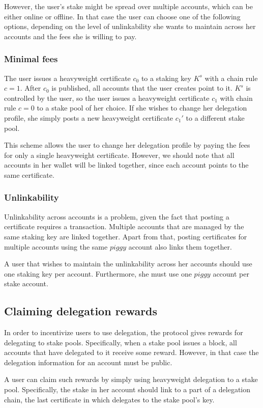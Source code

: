 However, the user's stake might be spread over multiple accounts, which can be either online or offline. In that case the user can choose one of the following options, depending on the level of unlinkability she wants to maintain across her accounts and the fees she is willing to pay.

\subsubsection{Minimal fees}

The user issues a heavyweight certificate $c_0$ to a staking key $K^s$ with a chain rule $c = 1$. After $c_0$ is published, all accounts that the user creates point to it. $K^s$ is controlled by the user, so the user issues a heavyweight certificate $c_1$ with chain rule $c = 0$ to a stake pool of her choice. If she wishes to change her delegation profile, she simply posts a new heavyweight certificate ${c_1}'$ to a different stake pool.

This scheme allows the user to change her delegation profile by paying the fees for only a single heavyweight certificate. However, we should note that all accounts in her wallet will be linked together, since each account points to the same certificate.

\subsubsection{Unlinkability}

Unlinkability across accounts is a problem, given the fact that posting a certificate requires a transaction. Multiple accounts that are managed by the same staking key are linked together. Apart from that, posting certificates for multiple accounts using the same $piggy$ account also links them together.

A user that wishes to maintain the unlinkability across her accounts should use one staking key per account. Furthermore, she must use one $piggy$ account per stake account.

\subsection{Claiming delegation rewards}

In order to incentivize users to use delegation, the protocol gives rewards for delegating to stake pools. Specifically, when a stake pool issues a block, all accounts that have delegated to it receive some reward. However, in that case the delegation information for an account must be public.

A user can claim such rewards by simply using heavyweight delegation to a stake pool. Specifically, the stake in her account should link to a part of a delegation chain, the last certificate in which delegates to the stake pool's key.